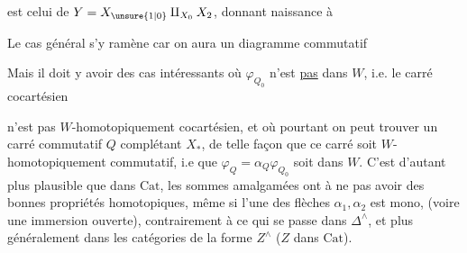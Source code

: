 est celui de $Y=X_{\unsure{1|0}}\amalg_{X_0}X_2$, donnant naissance à


Le cas général s'y ramène car on aura un diagramme commutatif


Mais il doit y avoir des cas intéressants où $\varphi_{Q_0}$ n'est \uline{pas} dans $W$, i.e. le carré cocartésien


n'est pas $W$-homotopiquement cocartésien, et où pourtant on peut trouver un carré commutatif $Q$
complétant $X_*$, de telle façon que ce carré soit $W$-homotopiquement commutatif, i.e que $\varphi_Q=\alpha_Q\varphi_{Q_0}$ soit dans $W$. C'est d'autant plus plausible que dans $\mathrm{Cat}$, les sommes amalgamées ont  à ne pas avoir des bonnes propriétés homotopiques, même si l'une des flèches $\alpha_1,\alpha_2$ est mono, (voire une immersion ouverte), contrairement à ce qui se passe dans $\Delta^\wedge$, et plus généralement dans les catégories de la forme $Z^\wedge$ ($Z$ dans $\mathrm{Cat}$).

